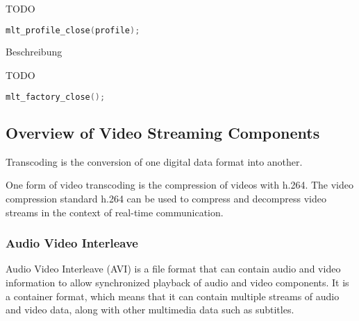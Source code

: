 \documentclass[../MasterThesis.tex]{subfiles}
\begin{document}
\begin{description}[font=\normalfont\color{RedViolet!80!black}, style=nextline]
	TODO
	
	\begin{lstlisting}[language=C, numbers=none, basicstyle=\scriptsize\ttfamily]
	mlt_profile_close(profile); \end{lstlisting}
	
	
	
	\item[Close the factory] Beschreibung
	
	TODO
	
	\begin{lstlisting}[language=C, numbers=none, basicstyle=\scriptsize\ttfamily]
	mlt_factory_close();
	\end{lstlisting}
	
	
\end{description}











\subsection{Overview of Video Streaming Components}
\label{subsection_OverviewVideoStreamingComponents}


Transcoding is the conversion of one digital data format into another.~\cite{transcoding}

One form of video transcoding is the compression of videos with h.264.
The video compression standard h.264 can be used to compress and decompress video streams in the context of real-time communication.~\cite{transcoding}
	




\subsubsection*{Audio Video Interleave} 

Audio Video Interleave (AVI) is a file format that can contain audio and video information to allow synchronized playback of audio and video components. 
It is a container format, which means that it can contain multiple streams of audio and video data, along with other multimedia data such as subtitles.~\cite{avi}
\end{document}
